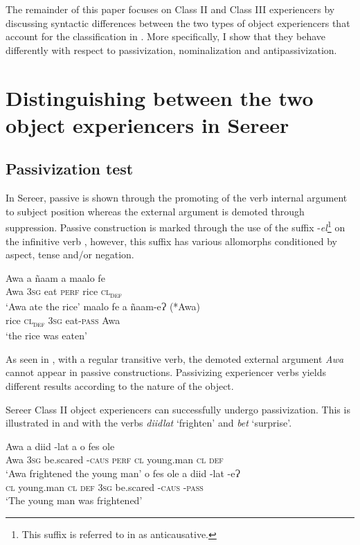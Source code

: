 \documentclass[output=paper]{langscibook}
\begin{document}
The remainder of this paper focuses on Class II and Class III experiencers by discussing syntactic differences between the two types of object experiencers that account for the classification in . More specifically, I show that they behave differently with respect to passivization, nominalization and antipassivization.


\section{Distinguishing between the two object  experiencers in Sereer}
\label{sec:tamba:3}
\subsection{Passivization test}
\label{sec:tamba:3.1}

In Sereer, passive is shown through the promoting of the verb internal argument to subject position whereas the external argument is demoted through suppression. Passive construction is marked through the use of the suffix -\textit{el}\footnote{This suffix is referred to in \citet{FayeMous2006} as anticausative.} on the infinitive verb \citep{Faye1979,Renaudier2012,Faye2013}, however, this suffix has various allomorphs conditioned by aspect, tense and/or negation.

\ea \label{ex:tamba:8}
\ea \label{ex:tamba:8a}
\gll Awa   a       ñaam   a         maalo fe\\
Awa   \textsc{3sg}   eat      \textsc{perf}    rice     \textsc{cl\textsubscript{def}}\\
\glt `Awa ate the rice'
\ex \label{ex:tamba:8b}
\gll maalo fe     a      ñaam-eɁ       (*Awa)\\
rice    \textsc{cl\textsubscript{def}} \textsc{3sg}  eat-\textsc{pass}   Awa\\
\glt `the rice was eaten'
\z
\z

As seen in , with a regular transitive verb, the demoted external argument \textit{Awa}  cannot appear in passive constructions. Passivizing experiencer verbs yields different results according to the nature of the object. 

Sereer Class II object experiencers can successfully undergo passivization. This is illustrated in  and  with the verbs \textit{diidlat} ‘frighten’ and \textit{bet} ‘surprise’. 

\ea \label{ex:tamba:9}
\ea \label{ex:tamba:9a}
\gll Awa  a      diid         {}-lat    a       o    fes            ole\\
Awa  \textsc{3sg} be.scared -\textsc{caus}  \textsc{perf}    \textsc{cl} young.man  \textsc{cl\textsubscript{} \textsc{def}}\\
\glt `Awa frightened the young man'
\ex \label{ex:tamba:9b}
\gll o  fes                ole     a      diid         {}-lat    {}-eɁ\\
\textsc{cl} young.man  \textsc{cl\textsubscript{} \textsc{def}}  \textsc{3sg}   be.scared -\textsc{caus}    \textsc{{}-pass}\\
\glt `The young man was frightened'
\z
\z
\end{document}
